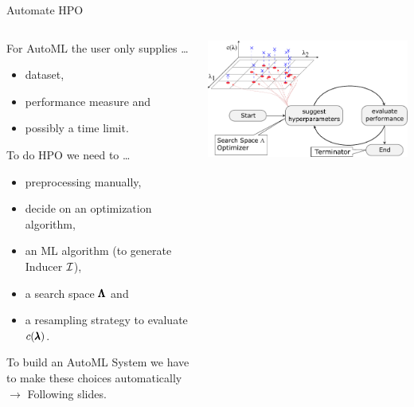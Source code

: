 \begin{frame}{Automate HPO}

  \begin{columns}
    \begin{column}{0.59\textwidth}

      For AutoML the user only supplies \ldots
      \begin{itemize}
        \item dataset,
        \item performance measure and
        \item possibly a time limit.
      \end{itemize}

      To do HPO we need to \ldots
      \begin{itemize}
        \item preprocessing manually,
        \item decide on an optimization algorithm,
        \item an ML algorithm (to generate Inducer $\mathcal{I}$),
        \item a search space $\pmb{\Lambda}$ and
        \item a resampling strategy to evaluate $c(\pmb{\lambda})$.
      \end{itemize}

      To build an AutoML System we have to make these choices automatically $\rightarrow$ Following slides.

    \end{column}%
    \begin{column}{0.4\textwidth}
      \begin{center}
        \includegraphics[width = \linewidth]{images/tuning.pdf}    
      \end{center}
    \end{column}
  \end{columns}

\end{frame}

